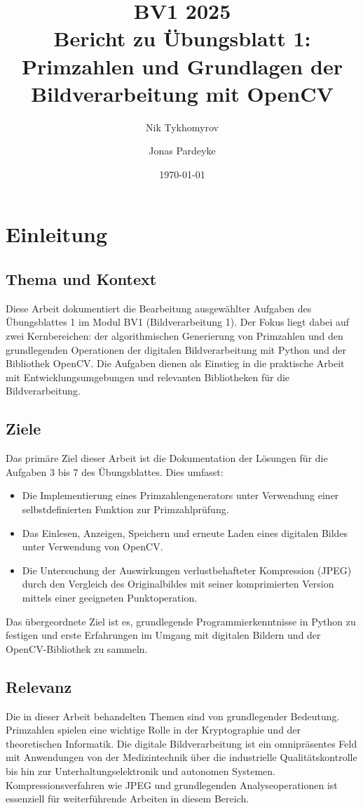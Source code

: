 \documentclass[titlepage]{article}
\title{BV1 2025\\Bericht zu Übungsblatt 1: \\ Primzahlen und Grundlagen der Bildverarbeitung mit OpenCV}
\author{Nik Tykhomyrov \and Jonas Pardeyke}
\date{\today} %
\begin{document}
\begin{titlepage}
    \maketitle
\end{titlepage}



\newpage
\tableofcontents
\newpage

\section{Einleitung}

\subsection{Thema und Kontext}
Diese Arbeit dokumentiert die Bearbeitung ausgewählter Aufgaben des Übungsblattes 1 im Modul BV1 (Bildverarbeitung 1). Der Fokus liegt dabei auf zwei Kernbereichen: der algorithmischen Generierung von Primzahlen und den grundlegenden Operationen der digitalen Bildverarbeitung mit Python und der Bibliothek OpenCV. Die Aufgaben dienen als Einstieg in die praktische Arbeit mit Entwicklungsumgebungen und relevanten Bibliotheken für die Bildverarbeitung.

\subsection{Ziele}
Das primäre Ziel dieser Arbeit ist die Dokumentation der Lösungen für die Aufgaben 3 bis 7 des Übungsblattes. Dies umfasst:
\begin{itemize}
    \item Die Implementierung eines Primzahlengenerators unter Verwendung einer selbstdefinierten Funktion zur Primzahlprüfung.
    \item Das Einlesen, Anzeigen, Speichern und erneute Laden eines digitalen Bildes unter Verwendung von OpenCV.
    \item Die Untersuchung der Auswirkungen verlustbehafteter Kompression (JPEG) durch den Vergleich des Originalbildes mit seiner komprimierten Version mittels einer geeigneten Punktoperation.
\end{itemize}
Das übergeordnete Ziel ist es, grundlegende Programmierkenntnisse in Python zu festigen und erste Erfahrungen im Umgang mit digitalen Bildern und der OpenCV-Bibliothek zu sammeln.

\subsection{Relevanz}
Die in dieser Arbeit behandelten Themen sind von grundlegender Bedeutung. Primzahlen spielen eine wichtige Rolle in der Kryptographie und der theoretischen Informatik. Die digitale Bildverarbeitung ist ein omnipräsentes Feld mit Anwendungen von der Medizintechnik über die industrielle Qualitätskontrolle bis hin zur Unterhaltungselektronik und autonomen Systemen. Kompressionsverfahren wie JPEG und grundlegenden Analyseoperationen ist essenziell für weiterführende Arbeiten in diesem Bereich.
\end{document}
